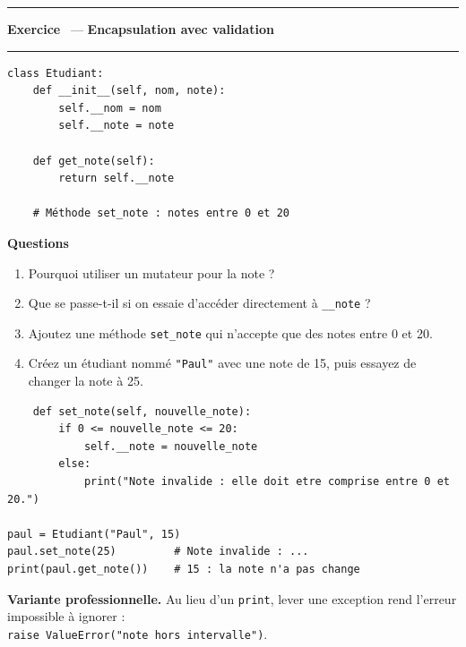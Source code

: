 \documentclass[10pt,a4paper]{article}
\newif\ifcorrige
\newcommand{\py}[1]{\texttt{#1}}
\newcounter{exo}
\newcommand{\exo}[1]{%
  \stepcounter{exo}\par\vspace{4pt}
  \ifcorrige\else\noindent\minipage{\textwidth}\fi
  \noindent\textcolor{qbar}{\rule{2.5pt}{10pt}}\hspace{4pt}%
  \textbf{\color{qbar}Exercice \theexo}\ --- \textbf{#1}%
  \par\nobreak\vspace{-3pt}\noindent\textcolor{qbar!35}{\rule{\textwidth}{0.6pt}}%
  \par\nobreak\vspace{1pt}}
\newenvironment{codebloc}
  {\ifcorrige\else\noindent\minipage[t]{0.50\textwidth}\vspace{0pt}\fi}
  {\ifcorrige\else\endminipage\hfill\fi}
\newenvironment{qbloc}
  {\ifcorrige\else\minipage[t]{0.475\textwidth}\vspace{0pt}\fi
   \textbf{\small Questions}\begin{enumerate}[leftmargin=*,nosep,label=\arabic*.]}
  {\end{enumerate}\ifcorrige\else\endminipage\par\fi}
\newcommand{\rep}[1]{\ifcorrige\par\smallskip{\color{corr}\small#1}\par\smallskip\fi}
\newlength{\zoneadj}\setlength{\zoneadj}{0pt}
\newcommand{\zone}[1][4cm]{%
  \ifcorrige\else
    \par\vspace{2pt}\noindent
    \begin{tcolorbox}[colback=white,colframe=black!45,boxrule=0.5pt,arc=1pt,height={\dimexpr#1-\zoneadj\relax},
      left=4pt,right=4pt,top=2pt,bottom=2pt,
      title={\scriptsize\itshape Réponses},coltitle=black!55,fonttitle=\itshape,
      detach title,before upper={\tcbtitle\par}]\end{tcolorbox}%
    \endminipage\par
  \fi}
\newenvironment{solution}
  {\ifcorrige
     \begin{tcolorbox}[enhanced,breakable,colback=corrbg,colframe=corr,boxrule=0.6pt,arc=1pt,
       left=5pt,right=5pt,top=3pt,bottom=3pt,fontupper=\small,
       title={Corrigé},coltitle=corr,fonttitle=\bfseries\small,detach title,
       before upper={\tcbtitle\par\smallskip}]%
   \else
     \setbox0\vbox\bgroup
   \fi}
  {\ifcorrige\end{tcolorbox}\else\egroup\fi}
\begin{document}
\exo{Encapsulation avec validation}
\begin{codebloc}
\begin{lstlisting}
class Etudiant:
    def __init__(self, nom, note):
        self.__nom = nom
        self.__note = note

    def get_note(self):
        return self.__note

    # Méthode set_note : notes entre 0 et 20
\end{lstlisting}
\end{codebloc}
\begin{qbloc}
  \item Pourquoi utiliser un mutateur pour la note ?
    \rep{Pour garantir un \emph{invariant} : une note reste comprise entre 0 et 20. Le mutateur est
    le seul point d'entrée en écriture, il peut donc vérifier la valeur avant de l'enregistrer.}
  \item Que se passe-t-il si on essaie d'accéder directement à \py{__note} ?
    \rep{Python lève une \py{AttributeError} : à cause du \emph{name mangling}, l'attribut s'appelle
    en réalité \py{_Etudiant__note} et le nom \py{__note} n'existe pas depuis l'extérieur.}
  \item Ajoutez une méthode \py{set_note} qui n'accepte que des notes entre 0 et 20.
  \item Créez un étudiant nommé \py{"Paul"} avec une note de 15, puis essayez de changer la note
    à 25.
\end{qbloc}
\zone[4.0cm]
\begin{solution}
\begin{lstlisting}
    def set_note(self, nouvelle_note):
        if 0 <= nouvelle_note <= 20:
            self.__note = nouvelle_note
        else:
            print("Note invalide : elle doit etre comprise entre 0 et 20.")

paul = Etudiant("Paul", 15)
paul.set_note(25)         # Note invalide : ...
print(paul.get_note())    # 15 : la note n'a pas change
\end{lstlisting}
\textbf{Variante professionnelle.} Au lieu d'un \py{print}, lever une exception rend l'erreur
impossible à ignorer :\\
\py{raise ValueError("note hors intervalle")}.
\end{solution}
\end{document}
